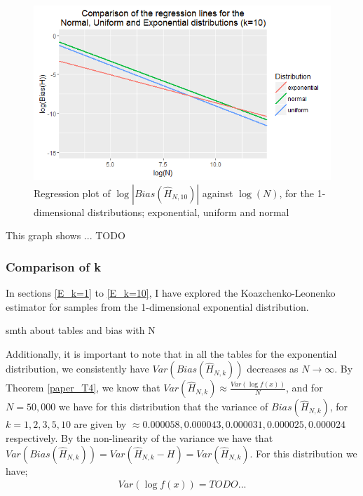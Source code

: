 \documentclass{article}
\begin{document}
\begin{figure}
  \begin{center}
    \includegraphics[width=\textwidth]{./Graphs/EUN_k=10_plot.png}
  \end{center}
\caption{Regression plot of $\log|Bias(\hat{H}_{N, 10})|$ against $\log(N)$, for the 1-dimensional distributions; exponential, uniform and normal}
  \label{E_U_N_k=10_graph}
\end{figure}

This graph shows ... TODO 





\subsubsection{Comparison of k} \label{E_compare_k}

In sections \ref{E_k=1} to \ref{E_k=10}, I have explored the Koazchenko-Leonenko estimator for samples from the 1-dimensional exponential distribution. 

smth about tables and bias with N

Additionally, it is important to note that in all the tables for the exponential distribution, we consistently have $Var(Bias(\hat{H}_{N, k}))$ decreases as $N \to \infty$. By Theorem \ref{paper_T4}, we know that $Var(\hat{H}_{N, k}) \approx \frac{Var(\log f(x))}{N}$, and for $N=50,000$ we have for this distribution that the variance of $Bias(\hat{H}_{N, k})$, for $k=1,2,3,5,10$ are given by $\approx 0.000058, 0.000043, 0.000031, 0.000025, 0.000024$ respectively. By the non-linearity of the variance we have that  $Var(Bias(\hat{H}_{N, k})) = Var(\hat{H}_{N,k} - H) = Var(\hat{H}_{N,k})$. For this distribution we have;
\begin{align}
Var(\log f(x)) = TODO... 
\end{align}
\end{document}
